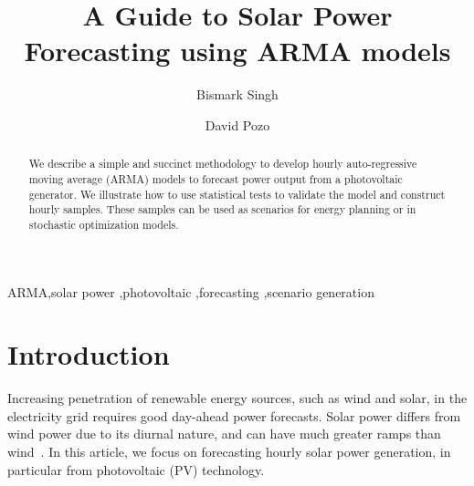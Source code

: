 \documentclass[review]{elsarticle}
\begin{document}
\begin{frontmatter}

\title{A Guide to Solar Power Forecasting using ARMA models}

\author{Bismark Singh}
\address{Discrete Mathematics \& Optimization, Sandia National Laboratories 
}


\author{David Pozo}
\address{Center for Energy Systems, Skolkovo Institute of Science and 
Technology}

\begin{abstract}
We describe a simple and succinct methodology to develop hourly auto-regressive 
moving 
average (ARMA) models to forecast power output from a photovoltaic generator. 
We illustrate how to use 
statistical tests to validate the model and construct hourly samples. These 
samples can be used as scenarios for energy planning or in stochastic 
optimization models.
\end{abstract}

\begin{keyword}
ARMA\sep solar power \sep photovoltaic \sep forecasting \sep scenario 
generation
\end{keyword}

\end{frontmatter}

\linenumbers

\section{Introduction}
Increasing penetration of renewable energy sources, such as wind and solar, in 
the electricity grid requires good day-ahead power forecasts. Solar power 
differs from wind power due to its diurnal nature, and can have much greater 
ramps than wind~\cite{graabak2016variability}. In this article, we focus 
on forecasting  hourly solar power generation, in particular from photovoltaic 
(PV) technology. 
\end{document}
